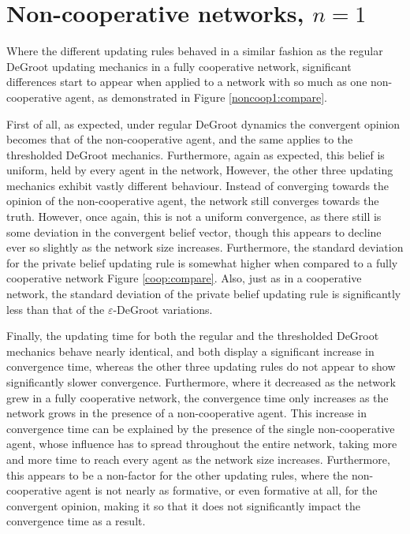 \documentclass[a4paper, 12pt]{report}
\begin{document}
\newpage

\section{Non-cooperative networks, $n=1$}

Where the different updating rules behaved in a similar fashion as the regular DeGroot updating mechanics in a fully cooperative network, significant differences start to appear when applied to a network with so much as one non-cooperative agent, as demonstrated in Figure \ref{noncoop1:compare}. 

\noindent First of all, as expected, under regular DeGroot dynamics the convergent opinion becomes that of the non-cooperative agent, and the same applies to the thresholded DeGroot mechanics. Furthermore, again as expected, this belief is uniform, held by every agent in the network, However, the other three updating mechanics exhibit vastly different behaviour. Instead of converging towards the opinion of the non-cooperative agent, the network still converges towards the truth. However, once again, this is not a uniform convergence, as there still is some deviation in the convergent belief vector, though this appears to decline ever so slightly as the network size increases. Furthermore, the standard deviation for the private belief updating rule is somewhat higher when compared to a fully cooperative network Figure \ref{coop:compare}. Also, just as in a cooperative network, the standard deviation of the private belief updating rule is significantly less than that of the $\varepsilon$-DeGroot variations.

\noindent Finally, the updating time for both the regular and the thresholded DeGroot mechanics behave nearly identical, and both display a significant increase in convergence time, whereas the other three updating rules do not appear to show significantly slower convergence. Furthermore, where it decreased as the network grew in a fully cooperative network, the convergence time only increases as the network grows in the presence of a non-cooperative agent. This increase in convergence time can be explained by the presence of the single non-cooperative agent, whose influence has to spread throughout the entire network, taking more and more time to reach every agent as the network size increases. Furthermore, this appears to be a non-factor for the other updating rules, where the non-cooperative agent is not nearly as formative, or even formative at all, for the convergent opinion, making it so that it does not significantly impact the convergence time as a result.
\end{document}
